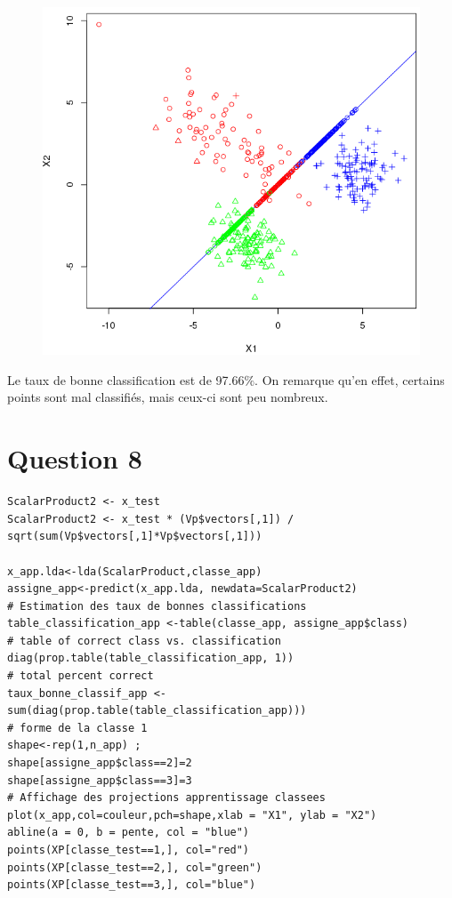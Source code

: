 \documentclass[a4paper,12pt]{report}
\begin{document}
\begin{figure}[!ht]
	\center
	\includegraphics[scale=0.4]{image/q7.png}
\end{figure}

Le taux de bonne classification est de 97.66$\%$. On remarque qu'en effet, certains points sont mal classifiés, mais ceux-ci sont peu nombreux.

\newpage


\section*{Question 8}

\begin{lstlisting}
ScalarProduct2 <- x_test
ScalarProduct2 <- x_test * (Vp$vectors[,1]) / sqrt(sum(Vp$vectors[,1]*Vp$vectors[,1]))

x_app.lda<-lda(ScalarProduct,classe_app)
assigne_app<-predict(x_app.lda, newdata=ScalarProduct2)
# Estimation des taux de bonnes classifications
table_classification_app <-table(classe_app, assigne_app$class)
# table of correct class vs. classification
diag(prop.table(table_classification_app, 1))
# total percent correct
taux_bonne_classif_app <-sum(diag(prop.table(table_classification_app)))
# forme de la classe 1
shape<-rep(1,n_app) ;
shape[assigne_app$class==2]=2
shape[assigne_app$class==3]=3
# Affichage des projections apprentissage classees
plot(x_app,col=couleur,pch=shape,xlab = "X1", ylab = "X2")
abline(a = 0, b = pente, col = "blue")
points(XP[classe_test==1,], col="red")
points(XP[classe_test==2,], col="green")
points(XP[classe_test==3,], col="blue")
\end{lstlisting}
\end{document}
